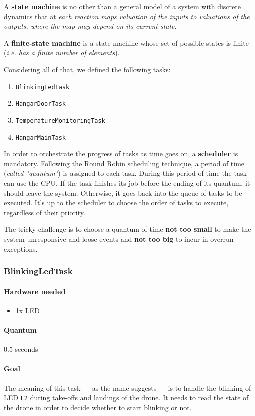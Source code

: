 \documentclass[12pt, letterpaper, twoside]{article}
\begin{document}
A \textbf{state machine} is no other than a general model of a system with discrete dynamics that at \textit{each reaction maps valuation of the inputs to valuations of the outputs, where the map may depend on its current state}. 

A \textbf{finite-state machine} is a state machine whose set of possible states is finite (\textit{i.e. has a finite number of elements}).

Considering all of that, we defined the following tasks:
\begin{enumerate}
    \item \texttt{BlinkingLedTask}
    \item \texttt{HangarDoorTask}
    \item \texttt{TemperatureMonitoringTask}
    \item \texttt{HangarMainTask}
\end{enumerate}

In order to orchestrate the progress of tasks as time goes on, a \textbf{scheduler} is mandatory. Following the Round Robin scheduling technique, a period of time (\textit{called "quantum"}) is assigned to each task. During this period of time the task can use the CPU. If the task finishes its job before the ending of its quantum, it should leave the system. Otherwise, it goes back into the queue of tasks to be executed.
It's up to the scheduler to choose the order of tasks to execute, regardless of their priority.

The tricky challenge is to choose a quantum of time \textbf{not too small} to make the system unresponsive and loose events and \textbf{not too big} to incur in overrun exceptions. 
\subsubsection{BlinkingLedTask}
\paragraph{Hardware needed}
\begin{itemize}
    \item 1x LED
\end{itemize}
\paragraph{Quantum}
0.5 seconds
\paragraph{Goal}
The meaning of this task — as the name suggests — is to handle the blinking of LED \texttt{L2} during take-offs and landings of the drone.
It needs to read the state of the drone in order to decide whether to start blinking or not.
\end{document}
